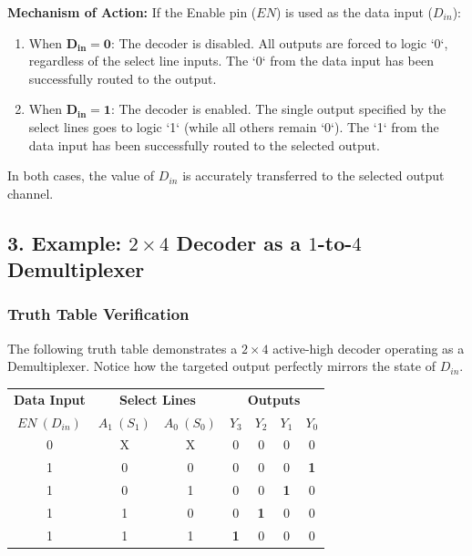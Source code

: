 \documentclass[12pt,a3paper]{article}
\begin{document}
\begin{enumerate}
\begin{tcolorbox}[enhanced,breakable,ansbox,colback=cD!4,colframe=cD,boxrule=0.8pt,arc=5pt,title={\textbf{Answer}},fonttitle=\bfseries\color{white},colbacktitle=cD]
\textbf{Mechanism of Action:} 
If the Enable pin ($EN$) is used as the data input ($D_{in}$):
\begin{enumerate}
    \item When $\mathbf{D_{in} = 0}$: The decoder is disabled. All outputs are forced to logic `0`, regardless of the select line inputs. The `0` from the data input has been successfully routed to the output.
    \item When $\mathbf{D_{in} = 1}$: The decoder is enabled. The single output specified by the select lines goes to logic `1` (while all others remain `0`). The `1` from the data input has been successfully routed to the selected output.
\end{enumerate}
In both cases, the value of $D_{in}$ is accurately transferred to the selected output channel.

\vspace{0.3cm}
\subsection*{3. Example: $2 \times 4$ Decoder as a $1$-to-$4$ Demultiplexer}

\subsubsection*{Truth Table Verification}
The following truth table demonstrates a $2 \times 4$ active-high decoder operating as a Demultiplexer. Notice how the targeted output perfectly mirrors the state of $D_{in}$.

\begin{center}
\renewcommand{\arraystretch}{1.2}
\begin{tabular}{c | cc | cccc}
\toprule
\textbf{Data Input} & \multicolumn{2}{c|}{\textbf{Select Lines}} & \multicolumn{4}{c}{\textbf{Outputs}} \\
$EN \ (D_{in})$ & $A_1 \ (S_1)$ & $A_0 \ (S_0)$ & $Y_3$ & $Y_2$ & $Y_1$ & $Y_0$ \\
\midrule
0 & X & X & 0 & 0 & 0 & 0 \\
\midrule
1 & 0 & 0 & 0 & 0 & 0 & \textcolor{cD}{\textbf{1}} \\
1 & 0 & 1 & 0 & 0 & \textcolor{cD}{\textbf{1}} & 0 \\
1 & 1 & 0 & 0 & \textcolor{cD}{\textbf{1}} & 0 & 0 \\
1 & 1 & 1 & \textcolor{cD}{\textbf{1}} & 0 & 0 & 0 \\
\bottomrule
\end{tabular}
\end{center}


\end{tcolorbox}
\end{enumerate}
\end{document}

